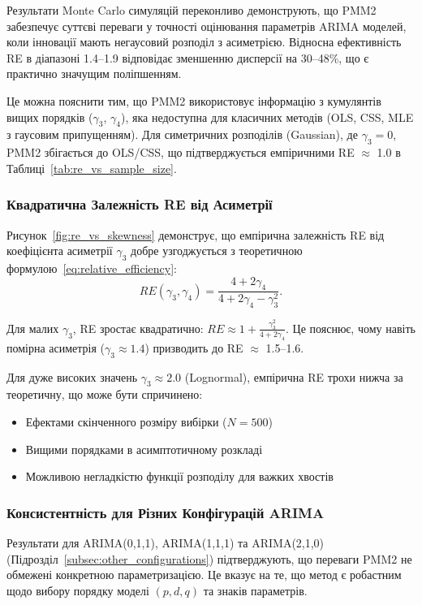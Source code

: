 \documentclass[12pt,a4paper]{article}
\begin{document}
	Результати Monte Carlo симуляцій переконливо демонструють, що PMM2 забезпечує суттєві переваги у точності оцінювання параметрів ARIMA моделей, коли інновації мають негаусовий розподіл з асиметрією. Відносна ефективність RE в діапазоні 1.4--1.9 відповідає зменшенню дисперсії на 30--48\%, що є практично значущим поліпшенням.
	
	Це можна пояснити тим, що PMM2 використовує інформацію з кумулянтів вищих порядків ($\gamma_3$, $\gamma_4$), яка недоступна для класичних методів (OLS, CSS, MLE з гаусовим припущенням). Для симетричних розподілів (Gaussian), де $\gamma_3 = 0$, PMM2 збігається до OLS/CSS, що підтверджується емпіричними RE $\approx$ 1.0 в Таблиці~\ref{tab:re_vs_sample_size}.
	
	\subsubsection{Квадратична Залежність RE від Асиметрії}
	
	Рисунок~\ref{fig:re_vs_skewness} демонструє, що емпірична залежність RE від коефіцієнта асиметрії $\gamma_3$ добре узгоджується з теоретичною формулою~\eqref{eq:relative_efficiency}:
	\begin{equation}
		RE(\gamma_3, \gamma_4) = \frac{4 + 2\gamma_4}{4 + 2\gamma_4 - \gamma_3^2}.
	\end{equation}
	
	Для малих $\gamma_3$, RE зростає квадратично: $RE \approx 1 + \frac{\gamma_3^2}{4 + 2\gamma_4}$. Це пояснює, чому навіть помірна асиметрія ($\gamma_3 \approx 1.4$) призводить до RE $\approx$ 1.5--1.6.
	
	Для дуже високих значень $\gamma_3 \approx 2.0$ (Lognormal), емпірична RE трохи нижча за теоретичну, що може бути спричинено:
	\begin{itemize}
		\item Ефектами скінченного розміру вибірки ($N = 500$)
		\item Вищими порядками в асимптотичному розкладі
		\item Можливою негладкістю функції розподілу для важких хвостів
	\end{itemize}
	
	\subsubsection{Консистентність для Різних Конфігурацій ARIMA}
	
	Результати для ARIMA(0,1,1), ARIMA(1,1,1) та ARIMA(2,1,0) (Підрозділ~\ref{subsec:other_configurations}) підтверджують, що переваги PMM2 не обмежені конкретною параметризацією. Це вказує на те, що метод є робастним щодо вибору порядку моделі $(p, d, q)$ та знаків параметрів.
	
\end{document}
